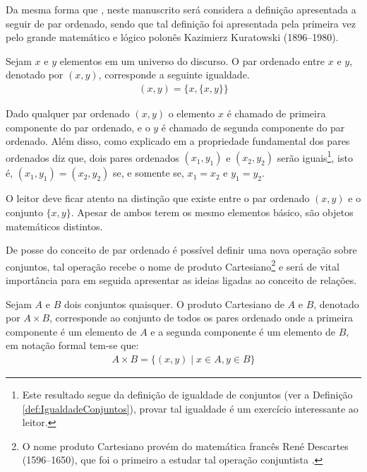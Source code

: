 Da mesma forma que \cite{abe1991-TC}, neste manuscrito será considera a definição apresentada a seguir de par ordenado, sendo que tal definição foi apresentada pela primeira vez pelo grande matemático e lógico polonês Kazimierz Kuratowski (1896--1980).

\begin{definition}\label{def:ParOrdenado}
	Sejam $x$ e $y$ elementos em um universo do discurso. O par ordenado entre $x$ e $y$, denotado por $(x, y)$, corresponde a seguinte igualdade.
	\begin{eqnarray*}
		(x, y) = \{x, \{x, y\}\}
	\end{eqnarray*}
\end{definition}

Dado qualquer par ordenado $(x,y)$ o elemento $x$ é chamado de primeira componente do par ordenado, e o $y$ é chamado de segunda componente do par ordenado. Além disso, como explicado em \cite{lipschutz2013-MD, lipschutz1978-TC} a propriedade fundamental dos pares ordenados diz que, dois pares ordenados $(x_1, y_1)$ e $(x_2, y_2)$ serão iguais\footnote{Este resultado  segue da definição de igualdade de conjuntos (ver a Definição \ref{def:IgualdadeConjuntos}), provar tal igualdade é um exercício interessante ao leitor.},  isto é, $(x_1, y_1) = (x_2, y_2)$ se, e somente se, $x_1 = x_2$ e $y_1 = y_2$.

\begin{remark}
	O leitor deve ficar atento na distinção que existe entre o par ordenado $(x,y)$ e o conjunto $\{x, y\}$. Apesar de ambos terem os mesmo elementos básico, são objetos matemáticos distintos.
\end{remark}

De posse do conceito de par ordenado é possível definir uma nova operação sobre conjuntos, tal operação recebe o nome de produto Cartesiano\footnote{O nome produto Cartesiano provém do matemática francês René Descartes (1596--1650), que foi o primeiro a estudar tal operação conjuntista \cite{lipschutz1978-TC}.} e será de vital importância para em seguida apresentar as ideias ligadas ao conceito de relações.

\begin{definition}\label{def:ProdutoCartesiano}
	Sejam $A$ e $B$ dois conjuntos quaisquer. O produto Cartesiano de $A$ e $B$, denotado por $A \times B$, corresponde ao conjunto de todos os pares ordenado onde a primeira componente é um elemento de $A$ e a segunda componente é um elemento de $B$, em notação formal tem-se que:
	\begin{eqnarray*}
		A \times B = \{(x, y) \mid x \in A, y \in B\}
	\end{eqnarray*}
\end{definition}

